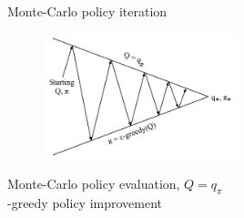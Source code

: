 \bgroup
\begin{frame}{Monte-Carlo policy iteration}
\begin{figure}
\centering
\includegraphics[width=0.5\textwidth]{img/mc_policy_iteration.pdf}
\end{figure}
 Monte-Carlo policy evaluation, $Q=q_{\pi}$\\
 \highlight{$\epsilon$}-greedy policy improvement
\end{frame}
\egroup